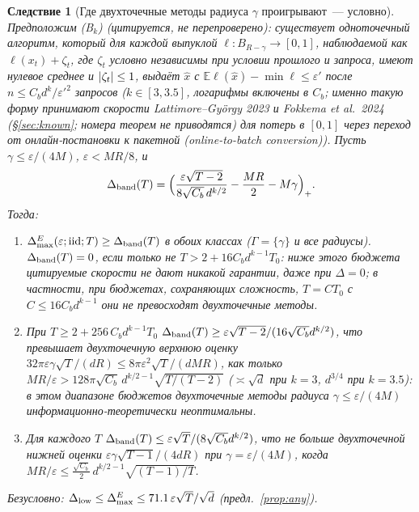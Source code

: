 \documentclass[11pt,a4paper]{article}
\numberwithin{equation}{section}
\newtheorem{corollary}[theorem]{Следствие}
\theoremstyle{definition}
\theoremstyle{remark}
\newcommand{\E}{\mathbb E}\newcommand{\R}{\mathbb R}\newcommand{\Z}{\mathbb Z}\let\Prob\relax\newcommand{\Prob}{\mathbb P}
\newcommand{\Dmax}{\Delta_{\max}}\newcommand{\Dcp}{\Delta_{\rm cp}}\newcommand{\Dlow}{\Delta_{\rm low}}
\begin{document}
\begin{corollary}[Где двухточечные методы радиуса $\gamma$ проигрывают~--- условно]\label{cor:cross}
\emph{Предположим} (B$_{k}$) (цитируется, не перепроверено): существует одноточечный алгоритм, который для каждой выпуклой $\ell:B_{R-\gamma}\to[0,1]$, наблюдаемой как $\ell(x_t)+\zeta_t$, где $\zeta_t$ условно независимы при условии прошлого и запроса, имеют нулевое среднее и $\lvert \zeta_t\rvert\le1$, выдаёт $\hat x$ с $\E\ell(\hat x)-\min\ell\le\varepsilon'$ после $n\le C_bd^k/\varepsilon'^2$ запросов ($k\in[3,3.5]$, логарифмы включены в $C_b$; именно такую форму принимают скорости Lattimore--Gy\"orgy 2023 и Fokkema et al.\ 2024 (\S\ref{sec:known}; номера теорем не приводятся) для потерь в $[0,1]$ через переход от онлайн-постановки к пакетной (online-to-batch conversion)). Пусть $\gamma\le\varepsilon/(4M)$, $\varepsilon<MR/8$, и
\[
\Delta_{\rm band}(T)=\Big(\frac{\varepsilon\sqrt{T-2}}{8\sqrt{C_b}\,d^{k/2}}-\frac{MR}2-M\gamma\Big)_+ .
\]
Тогда:
\begin{enumerate}[label=(\alph*)]
\item $\Dmax^E(\varepsilon;\iid;T)\ge\Delta_{\rm band}(T)$ в обоих классах ($\Gamma=\{\gamma\}$ и все радиусы). $\Delta_{\rm band}(T)=0$, если только не $T>2+16C_bd^{k-1}T_0$: \emph{ниже этого бюджета цитируемые скорости не дают никакой гарантии, даже при $\Delta=0$}; в частности, при бюджетах, сохраняющих сложность, $T=CT_0$ с $C\le16C_bd^{k-1}$ они не превосходят двухточечные методы.
\item При $T\ge2+256\,C_bd^{k-1}T_0$ $\Delta_{\rm band}(T)\ge\varepsilon\sqrt{T-2}/(16\sqrt{C_b}d^{k/2})$, что превышает двухточечную верхнюю оценку $32\pi\varepsilon\gamma\sqrt T/(dR)\le8\pi\varepsilon^2\sqrt T/(dMR)$, как только $MR/\varepsilon>128\pi\sqrt{C_b}\,d^{k/2-1}\sqrt{T/(T-2)}$ ($\asymp\sqrt d$ при $k=3$, $d^{3/4}$ при $k=3.5$): в этом диапазоне бюджетов двухточечные методы радиуса $\gamma\le\varepsilon/(4M)$ информационно-теоретически неоптимальны.
\item Для каждого $T$ $\Delta_{\rm band}(T)\le\varepsilon\sqrt T/(8\sqrt{C_b}d^{k/2})$, что не больше двухточечной нижней оценки $\varepsilon\gamma\sqrt{T-1}/(4dR)$ при $\gamma=\varepsilon/(4M)$, когда $MR/\varepsilon\le\frac{\sqrt{C_b}}2\,d^{k/2-1}\sqrt{(T-1)/T}$.
\end{enumerate}
Безусловно: $\Dlow\le\Dmax^E\le71.1\,\varepsilon\sqrt T/\sqrt d$ (предл.~\ref{prop:any}).
\end{corollary}
\end{document}
